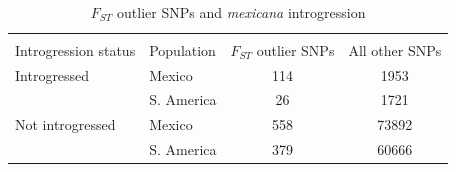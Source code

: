 \begin{table}[h]	
	\caption[]{$F_{ST}$ outlier SNPs and \emph{mexicana} introgression\hspace*{0.3cm}} 
			\centering
			\textbf{}\\[-2mm]
			{\fontsize{7}{11}\sf
		    \begin{tabular}{llcc} \hline\hline
		    & & \\[-3mm]
		    Introgression status & Population & $F_{ST}$ outlier SNPs & All other SNPs \\
		    \hline
		   Introgressed & Mexico & 114 & 1953 \\
		 	& S. America & 26 & 1721 \\
		   Not introgressed & Mexico & 558 & 73892 \\
		 	& S. America & 379 & 60666 \\
		      \hline\hline
		    \end{tabular}
		    \label{supp:introgressed}  %
		}
\end{table}


